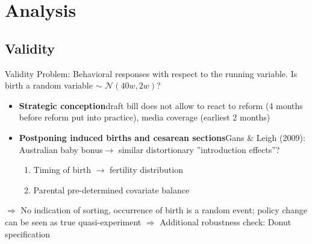 \documentclass[handout]{beamer} %
\begin{document}
\section{Analysis}
\subsection{Validity}
\begin{frame}{Validity}
Problem: Behavioral responses with respect to the running variable. Is birth a random variable $\sim$ $\mathcal{N}(40w,2w)$?\pause
\begin{itemize}
\item \textbf{Strategic conception}\newline draft bill does not allow to react to reform (4 months before reform put into practice), media coverage (earliest 2 months)

\item \textbf{Postponing induced births and cesarean sections}\newline Gans \& Leigh (2009): Australian baby bonus\newline $\rightarrow$ similar distortionary ”introduction effects”?\pause



\begin{enumerate}
\item Timing of birth $\rightarrow$ fertility distribution
\item Parental pre-determined covariate balance
\end{enumerate}
\end{itemize}\pause
\medskip
$\Rightarrow$ No indication of sorting, occurrence of birth is a random event; policy change can be seen as true quasi-experiment \newline $\Rightarrow$ Additional robustness check: Donut specification
\end{frame}
\end{document}
